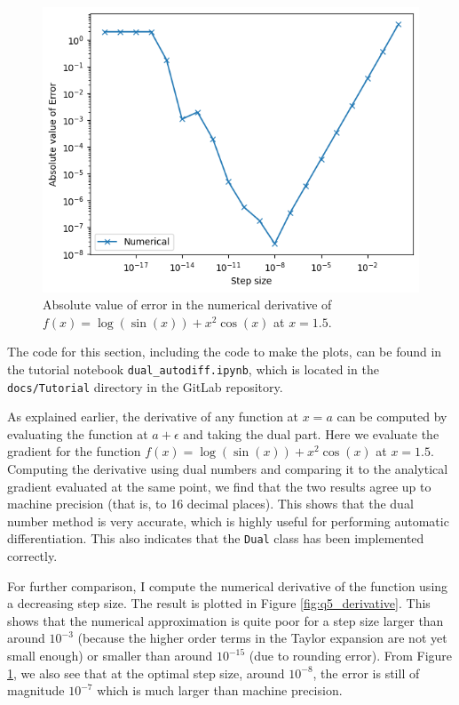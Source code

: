 \documentclass{article}
\begin{document}
\begin{figure}[h!]
    \centering
    \includegraphics[width=0.7\linewidth]{q5_error.png}
    \caption{Absolute value of error in the numerical derivative of \(f(x) = \log(\sin(x)) +x^2 \cos(x)\) at \(x=1.5\). }
    \label{fig:q5_error}
\end{figure}

The code for this section, including the code to make the plots, can be found in the tutorial notebook \texttt{dual\_autodiff.ipynb}, which is located in the \texttt{docs/Tutorial} directory in the GitLab repository.

As explained earlier, the derivative of any function at $x=a$ can be computed by evaluating the function at $a+\epsilon$ and taking the dual part. Here we evaluate the gradient for the function $ f(x) = \log(\sin(x)) + x^2 \cos(x) $ at $x=1.5$. Computing the derivative using dual numbers and comparing it to the analytical gradient evaluated at the same point, we find that the two results agree up to machine precision (that is, to 16 decimal places). This shows that the dual number method is very accurate, which is highly useful for performing automatic differentiation. This also indicates that the \texttt{Dual} class has been implemented correctly. 

For further comparison, I compute the numerical derivative of the function using a decreasing step size. The result is plotted in Figure \ref{fig:q5_derivative}. This shows that the numerical approximation is quite poor for a step size larger than around $10^{-3}$ (because the higher order terms in the Taylor expansion are not yet small enough) or smaller than around $10^{-15}$ (due to rounding error). From Figure \ref{fig:q5_error}, we also see that at the optimal step size, around $10^{-8}$, the error is still of magnitude $10^{-7}$ which is much larger than machine precision. 
\end{document}
